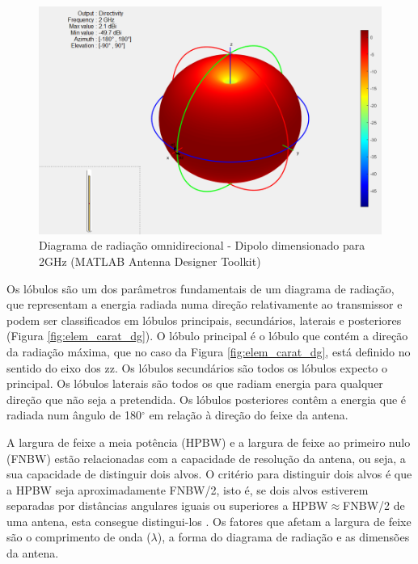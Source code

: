 \begin{figure}[h]
\centering
\includegraphics[scale=0.6]{chapters/ch3/assets/matlab_ad2}
\caption[Diagrama de radiação omnidirecional]{Diagrama de radiação omnidirecional - Dipolo dimensionado para 2GHz (MATLAB Antenna Designer Toolkit)}
\label{fig:omnidirecional}
\end{figure}

Os lóbulos são um dos parâmetros fundamentais de um diagrama de radiação, que representam a energia radiada numa direção relativamente ao transmissor e podem ser classificados em lóbulos principais, secundários, laterais e posteriores (Figura \ref{fig:elem_carat_dg}). O lóbulo principal é o lóbulo que contém a direção da radiação máxima, que no caso da Figura \ref{fig:elem_carat_dg}, está definido no sentido do eixo dos zz. Os lóbulos secundários são todos os lóbulos expecto o principal. Os lóbulos laterais são todos os que radiam energia para qualquer direção que não seja a pretendida. Os lóbulos posteriores contêm a energia que é radiada num ângulo de 180$^{\circ}$ em relação à direção do feixe da antena. \par 

A largura de feixe a meia potência (\gls{HPBW}) e a largura de feixe ao primeiro nulo (\gls{FNBW}) estão relacionadas com a capacidade de resolução da antena, ou seja, a sua capacidade de distinguir dois alvos. O critério para distinguir dois alvos é que a \gls{HPBW} seja aproximadamente \gls{FNBW}/2, isto é, se dois alvos estiverem separadas por distâncias angulares iguais ou superiores a \gls{HPBW}$\approx$\gls{FNBW}/2 de uma antena, esta consegue distingui-los \parencite{Kraus1988}. Os fatores que afetam a largura de feixe são o comprimento de onda ($\lambda$), a forma do diagrama de radiação e as dimensões da antena. \par 

